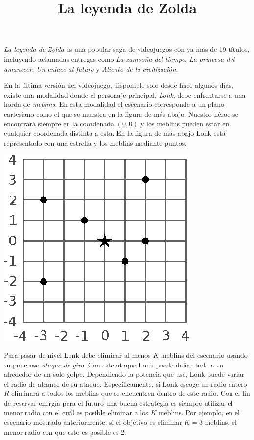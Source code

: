 \documentclass{oci}
\title{La leyenda de Zolda}
\begin{document}
\begin{problemDescription}
  \emph{La leyenda de Zolda} es una popular saga de videojuegos con ya más de 19
  títulos, incluyendo aclamadas entregas como \emph{La zampoña del tiempo},
  \emph{La princesa del amanecer}, \emph{Un enlace al futuro} y \emph{Aliento de
  la civilización}.

  En la última versión del videojuego, disponible solo desde hace algunos días,
  existe una modalidad donde el personaje principal, \emph{Lonk}, debe
  enfrentarse a una horda de \emph{meblins}.
  En esta modalidad el escenario corresponde a un plano cartesiano como el que
  se muestra en la figura de más abajo.
  Nuestro héroe se encontrará siempre en la coordenada $(0,0)$ y los meblins
  pueden estar en cualquier coordenada distinta a esta.
  En la figura de más abajo Lonk está representado con una estrella y los meblins
  mediante puntos.
  \vspace{-0.5em}
  \begin{center}
  \includegraphics[scale=0.9]{zolda}
  \end{center}
  \vspace{-0.5em}
  Para pasar de nivel Lonk debe eliminar al menos $K$ meblins del escenario
  usando su poderoso \emph{ataque de giro}.
  Con este ataque Lonk puede dañar todo a su alrededor de un solo golpe.
  Dependiendo la potencia que use, Lonk puede variar el radio de alcance de su
  ataque.
  Específicamente, si Lonk escoge un radio entero $R$ eliminará a todos los
  meblins que se encuentren dentro de este radio.
  Con el fin de reservar energía para el futuro una buena estrategia es siempre
  utilizar el menor radio con el cuál es posible eliminar a los $K$ meblins.
  Por ejemplo, en el escenario mostrado anteriormente, si el objetivo es eliminar
  $K=3$ meblins, el menor radio con que esto es posible es 2.


\end{problemDescription}
\end{document}

